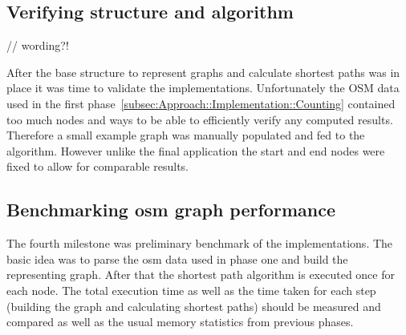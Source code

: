 \subsection{Verifying structure and algorithm}
\label{subsec:Approach::Implementation::Verification}

// wording?!

After the base structure to represent graphs and calculate shortest paths was in place it was time to validate the implementations. Unfortunately the OSM data used in the first phase~\ref{subsec:Approach::Implementation::Counting} contained too much nodes and ways to be able to efficiently verify any computed results. Therefore a small example graph was manually populated and fed to the algorithm. However unlike the final application the start and end nodes were fixed to allow for comparable results.

\subsection{Benchmarking \gls{osm} graph performance}
\label{subsec:Approach::Implementation::Benchmark}

The fourth milestone was preliminary benchmark of the implementations. The basic idea was to parse the \gls{osm} data used in phase one and build the representing graph. After that the shortest path algorithm is executed once for each node. The total execution time as well as the time taken for each step (building the graph and calculating shortest paths) should be measured and compared as well as the usual memory statistics from previous phases.

